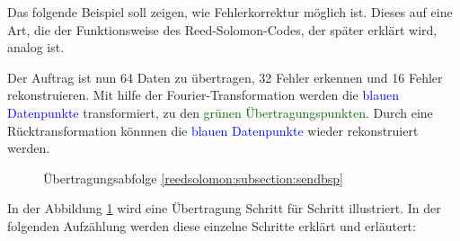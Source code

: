Das folgende Beispiel soll zeigen, wie Fehlerkorrektur möglich ist.
Dieses auf eine Art, die der Funktionsweise des Reed-Solomon-Codes,
der später erklärt wird, analog ist.
\par
Der Auftrag ist nun 64 Daten zu übertragen, 32 Fehler erkennen und 16 Fehler rekonstruieren.
Mit hilfe der Fourier-Transformation werden die \textcolor{blue}{blauen Datenpunkte} transformiert,
zu den \textcolor{darkgreen}{grünen Übertragungspunkten}. 
Durch eine Rücktransformation könnnen die \textcolor{blue}{blauen Datenpunkte} wieder rekonstruiert werden.
\par
\begin{figure}
	\centering
	\caption{Übertragungsabfolge \ref{reedsolomon:subsection:sendbsp}}
	\label{fig:sendorder}
\end{figure}
In der Abbildung \ref{fig:sendorder} wird eine Übertragung Schritt für Schritt illustriert.
In der folgenden Aufzählung werden diese einzelne Schritte erklärt und erläutert:
